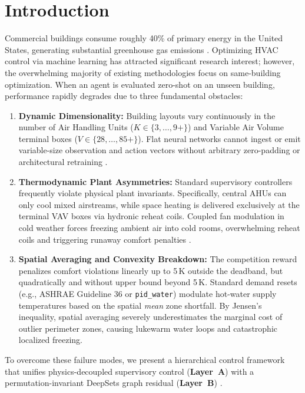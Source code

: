 \documentclass{article}
\begin{document}
\section{Introduction}
Commercial buildings consume roughly 40\% of primary energy in the United States, generating substantial greenhouse gas emissions \cite{wang2020reinforcement,zhang2019whole}. Optimizing HVAC control via machine learning has attracted significant research interest; however, the overwhelming majority of existing methodologies focus on same-building optimization. When an agent is evaluated zero-shot on an unseen building, performance rapidly degrades due to three fundamental obstacles:
\begin{enumerate}[leftmargin=*]
    \item \textbf{Dynamic Dimensionality:} Building layouts vary continuously in the number of Air Handling Units ($K \in \{3, \dots, 9+\}$) and Variable Air Volume terminal boxes ($V \in \{28, \dots, 85+\}$). Flat neural networks cannot ingest or emit variable-size observation and action vectors without arbitrary zero-padding or architectural retraining \cite{goldfeder2026smart}.
    \item \textbf{Thermodynamic Plant Asymmetries:} Standard supervisory controllers frequently violate physical plant invariants. Specifically, central AHUs can only cool mixed airstreams, while space heating is delivered exclusively at the terminal VAV boxes via hydronic reheat coils. Coupled fan modulation in cold weather forces freezing ambient air into cold rooms, overwhelming reheat coils and triggering runaway comfort penalties \cite{goldfeder2024smart}.
    \item \textbf{Spatial Averaging and Convexity Breakdown:} The competition reward penalizes comfort violations linearly up to 5\,K outside the deadband, but quadratically and without upper bound beyond 5\,K. Standard demand resets (e.g., ASHRAE Guideline 36 \cite{ashrae2018guideline36} or \texttt{pid\_water}) modulate hot-water supply temperatures based on the spatial \textit{mean} zone shortfall. By Jensen's inequality, spatial averaging severely underestimates the marginal cost of outlier perimeter zones, causing lukewarm water loops and catastrophic localized freezing.
\end{enumerate}

To overcome these failure modes, we present a hierarchical control framework that unifies physics-decoupled supervisory control (\textbf{Layer~A}) with a permutation-invariant DeepSets graph residual (\textbf{Layer~B}) \cite{zaheer2017deep}.
\end{document}
